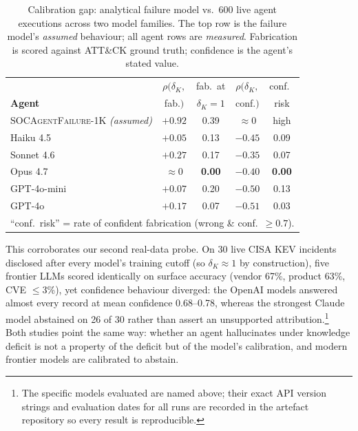 \documentclass[journal,compsoc]{IEEEtran}
\newcommand{\SAFK}{\textsc{SOCAgentFailure-1K}}
\begin{document}
\begin{table}[t]
\caption{Calibration gap: analytical failure model vs.\ 600 live agent
executions across two model families. The top row is the failure model's
\emph{assumed} behaviour; all agent rows are \emph{measured}. Fabrication is
scored against ATT\&CK ground truth; confidence is the agent's stated value.}
\label{tab:calib_mag}
\centering
\footnotesize
\setlength{\tabcolsep}{3.5pt}
\begin{tabular}{lcccc}
\toprule
 & $\rho(\delta_K,$ & fab.\ at & $\rho(\delta_K,$ & conf.\ \\
\textbf{Agent} & fab.$)$ & $\delta_K{=}1$ & conf.$)$ & risk \\
\midrule
\SAFK{} \emph{(assumed)} & $+0.92$ & 0.39 & $\approx 0$ & high \\
\midrule
Haiku 4.5          & $+0.05$ & 0.13 & $-0.45$ & 0.09 \\
Sonnet 4.6         & $+0.27$ & 0.17 & $-0.35$ & 0.07 \\
Opus 4.7           & $\approx 0$ & \textbf{0.00} & $-0.40$ & \textbf{0.00} \\
GPT-4o-mini        & $+0.07$ & 0.20 & $-0.50$ & 0.13 \\
GPT-4o             & $+0.17$ & 0.07 & $-0.51$ & 0.03 \\
\bottomrule
\multicolumn{5}{l}{\footnotesize ``conf.\ risk'' = rate of confident
fabrication (wrong \& conf.\ $\geq 0.7$).}
\end{tabular}
\end{table}

This corroborates our second real-data probe. On 30 live CISA KEV
incidents disclosed after every model's training cutoff (so $\delta_K
\approx 1$ by construction), five frontier LLMs scored identically on
surface accuracy (vendor 67\%, product 63\%, CVE $\leq$3\%), yet
confidence behaviour diverged: the OpenAI models answered almost
every record at mean confidence 0.68--0.78, whereas the strongest
Claude model abstained on 26 of 30 rather than assert an unsupported
attribution.\footnote{The specific models evaluated are named above; their
exact API version strings and evaluation dates for all runs are recorded in
the artefact repository so every result is reproducible.} Both
studies point the same way: whether an agent hallucinates under
knowledge deficit is not a property of the deficit but of the model's
calibration, and modern frontier models are calibrated to abstain.
\end{document}
